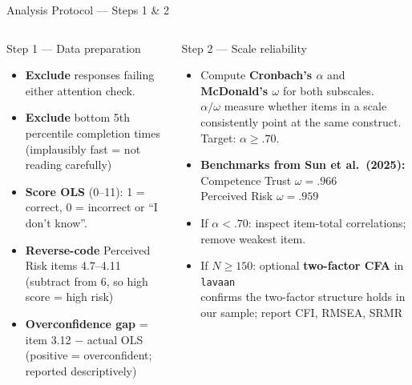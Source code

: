 \documentclass[10pt,aspectratio=169]{beamer}
\begin{document}
\begin{frame}{Analysis Protocol --- Steps 1 \& 2}
  \begin{columns}[T]
    \begin{block}{Step 1 --- Data preparation}
      \begin{itemize}
        \item \textbf{Exclude} responses failing either attention check.
        \item \textbf{Exclude} bottom 5th percentile completion times\\
              {\footnotesize (implausibly fast = not reading carefully)}
        \item \textbf{Score OLS} (0--11): 1 = correct, 0 = incorrect or ``I don't know''.
        \item \textbf{Reverse-code} Perceived Risk items 4.7--4.11\\
              {\footnotesize (subtract from 6, so high score = high risk)}
        \item \textbf{Overconfidence gap} = item 3.12 $-$ actual OLS\\
              {\footnotesize (positive = overconfident; reported descriptively)}
      \end{itemize}
    \end{block}
    
    \begin{block}{Step 2 --- Scale reliability}
      \begin{itemize}
        \item Compute \textbf{Cronbach's $\alpha$} and \textbf{McDonald's $\omega$}
              for both subscales.\\
              {\footnotesize $\alpha/\omega$ measure whether items in a scale
              consistently point at the same construct. Target: $\alpha \geq .70$.}
        \item \textbf{Benchmarks from Sun et al.\ (2025):}\\
              Competence Trust $\omega = .966$\\
              Perceived Risk $\omega = .959$
        \item If $\alpha < .70$: inspect item-total correlations; remove weakest item.
        \item If $N \geq 150$: optional \textbf{two-factor CFA} in \texttt{lavaan}\\
              {\footnotesize confirms the two-factor structure holds in our sample;
              report CFI, RMSEA, SRMR}
      \end{itemize}
    \end{block}
  \end{columns}
\end{frame}
 
\end{document}
